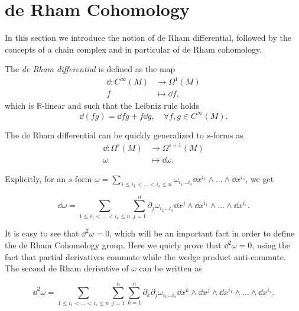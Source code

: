 \section{de Rham Cohomology}
\label{sec:derham}

In this section we introduce the notion of de Rham differential, followed by the concepts of a chain complex and in particular of de Rham cohomology.

\begin{definition}
    The \emph{de Rham differential} is defined as the map
    \begin{align*}
        \dd : C^{\infty}(M) &\rightarrow \Omega^1(M) \\
        f &\mapsto \dd f ,
    \end{align*}
    which is $\mathbb{R}$-linear and such that the Leibniz rule holds
    \begin{equation*}
        \dd (fg) = \dd fg + f \dd g, \quad \forall f, g \in C^{\infty}(M).
    \end{equation*}
\end{definition}

The de Rham differential can be quickly generalized to $s$-forms as
\begin{align*}
    \dd : \Omega^s (M) &\rightarrow \Omega^{s+1}(M) \\
    \omega &\mapsto \dd \omega .
\end{align*}

Explicitly, for an $s$-form $\omega = \sum_{1 \leq i_1 < \ldots < i_s \leq n} \omega_{i_1 \ldots i_s} \dd x^{i_1} \wedge \ldots \wedge \dd x^{i_s}$, we get

\begin{equation*}
    \dd \omega = \sum_{1 \leq i_1 < \ldots < i_s \leq n} \sum_{j = 1}^n \partial_j \omega_{i_1 \ldots i_s} \dd x^j \wedge \dd x^{i_1} \wedge \ldots \wedge \dd x^{i_s} .
\end{equation*}

It is easy to see that $\dd ^2 \omega = 0$, which will be an important fact in order to define the de Rham Cohomology group.
Here we quicly prove that $\dd^2 \omega = 0$, using the fact that partial derivatives commute while the wedge product anti-commute.
The second de Rham derivative of $\omega$ can be written as

\begin{equation*}
    \dd ^2 \omega =
    \sum_{1 \leq i_1 < \ldots < i_s \leq n} \sum_{j = 1}^n \sum_{k = 1}^n
    \partial_k \partial_j \omega_{i_1 \ldots i_s}
    \dd x^k \wedge \dd x^j \wedge \dd x^{i_1} \wedge \ldots \wedge \dd x^{i_s}.
\end{equation*}

